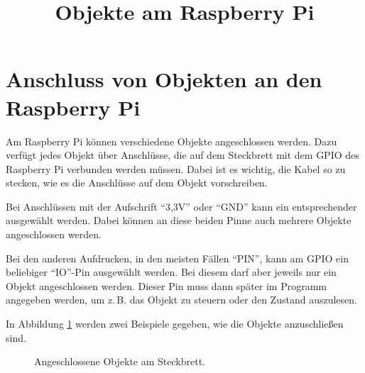 \documentclass[11pt, a4paper]{scrartcl}
\title{Objekte am Raspberry Pi}
\begin{document}

\section*{Anschluss von Objekten an den Raspberry Pi}

Am Raspberry Pi können verschiedene Objekte angeschlossen werden. Dazu verfügt jedes Objekt über Anschlüsse, die auf dem Steckbrett mit dem GPIO des Raspberry Pi verbunden werden müssen. Dabei ist es wichtig, die Kabel so zu stecken, wie es die Anschlüsse auf dem Objekt vorschreiben.

Bei Anschlüssen mit der Aufschrift \enquote{3,3V} oder \enquote{GND} kann ein entsprechender ausgewählt werden. Dabei können an diese beiden Pinne auch mehrere Objekte angeschlossen werden.

Bei den anderen Aufdrucken, in den meisten Fällen \enquote{PIN}, kann am GPIO ein beliebiger \enquote{IO}-Pin ausgewählt werden. Bei diesem darf aber jeweils nur ein Objekt angeschlossen werden. Dieser Pin muss dann später im Programm angegeben werden, um z.\,B. das Objekt zu steuern oder den Zustand auszulesen.

In Abbildung \ref{fig:objekte_steckbrett} werden zwei Beispiele gegeben, wie die Objekte anzuschließen sind.

\begin{figure}[htb]
     \hfill
    \caption{Angeschlossene Objekte am Steckbrett.}
    \label{fig:objekte_steckbrett}
\end{figure}
\end{document}
